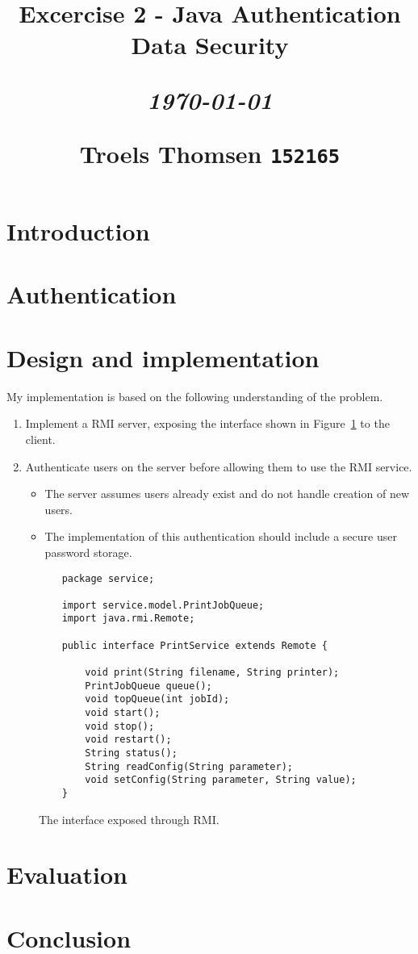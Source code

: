 \documentclass[12pt]{article}
\title{
  \vspace{4cm}
  \begin{flushleft}
  \Large{\textbf{Excercise 2 - Java Authentication}} \\
  \large{Data Security} \\
  \end{flushleft}
  \vspace{0cm}
  \begin{flushleft}
  \small
  \textit{\today}
  \end{flushleft}
  \vspace{12cm}
  \begin{flushleft}
  \small
  Troels Thomsen \texttt{152165}
  \end{flushleft}
}
\date{
}
\begin{document}
\clearpage
{}
\thispagestyle{empty}
\maketitle

\newpage


\section{Introduction}
\label{sec:Introduction}

\newpage

\section{Authentication}
\label{sec:Authentication}

\newpage

\section{Design and implementation}
\label{sec:Design and implementation}

My implementation is based on the following understanding of the problem.

\begin{enumerate}
    \item Implement a RMI server, exposing the interface shown in Figure~\ref{fig:service-interface} to the client.
    \item Authenticate users on the server before allowing them to use the RMI service.
    \begin{itemize}
        \item The server assumes users already exist and do not handle creation of new users.
        \item The implementation of this authentication should include a secure user password storage.
    \end{itemize}
\end{enumerate}

\begin{figure}[h!]
    \begin{lstlisting}
    package service;

    import service.model.PrintJobQueue;
    import java.rmi.Remote;

    public interface PrintService extends Remote {

        void print(String filename, String printer);
        PrintJobQueue queue();
        void topQueue(int jobId);
        void start();
        void stop();
        void restart();
        String status();
        String readConfig(String parameter);
        void setConfig(String parameter, String value);
    }
    \end{lstlisting}
    \label{fig:service-interface}
    \caption{The interface exposed through RMI.}
\end{figure}

\newpage

\section{Evaluation}
\label{sec:Evaluation}

\newpage

\section{Conclusion}
\label{sec:Conclusion}
\end{document}
